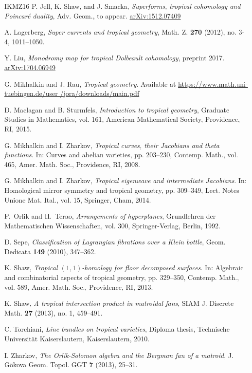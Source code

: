 \documentclass[11pt]{article}
\numberwithin{equation}{numsection}
\begin{document}
\begin{thebibliography}{IKMZ16}
P. Jell, K. Shaw, and J. Smacka,
\emph{Superforms, tropical cohomology and {P}oincar\'e duality},
Adv. Geom., to appear.
  \href{https://arxiv.org/abs/1512.07409}{arXiv:1512.07409}

A. Lagerberg,
\emph{Super currents and tropical geometry},
Math. Z. {\bf 270} (2012), no. 3-4, 1011--1050.

Y. Liu,
\emph{Monodromy map for tropical Dolbeault cohomology}, preprint 2017.
  \href{https://arxiv.org/abs/1704.06949}{arXiv:1704.06949}

G. Mikhalkin and J. Rau,
\emph{Tropical geometry}.
Available at
  \href{https://www.math.uni-tuebingen.de/user/jora/downloads/main.pdf}{https://www.math.uni-tuebingen.de/user /jora/downloads/main.pdf}

D. Maclagan and B. Sturmfels,
\emph{Introduction to tropical geometry}, 
Graduate Studies in Mathematics, vol. 161,
American Mathematical Society, Providence, RI, 2015.

G. Mikhalkin and I. Zharkov,
\emph{Tropical curves, their {J}acobians and theta functions}.
In: Curves and abelian varieties, 
pp. 203--230, Contemp. Math., vol. 465, Amer. Math. Soc., Providence, RI, 2008.

G. Mikhalkin and I. Zharkov,
\emph{Tropical eigenwave and intermediate {J}acobians}.
In: Homological mirror symmetry and tropical geometry, 
pp. 309--349, Lect. Notes Unione Mat. Ital., vol. 15, Springer, Cham, 2014.

P.~Orlik and H.~Terao,
\emph{Arrangements of hyperplanes},
Grundlehren der Mathematischen Wissenschaften, vol. 300,
Springer-Verlag, Berlin, 1992.

D. Sepe,
\emph{Classification of {L}agrangian fibrations over a {K}lein bottle},
Geom. Dedicata {\bf 149} (2010), 347--362.

K. Shaw,
\emph{Tropical $(1, 1)$-homology for floor decomposed surfaces}.
In: Algebraic and combinatorial aspects of tropical geometry, pp. 329--350, Contemp. Math., vol. 589, Amer. Math. Soc., Providence, RI, 2013.

K. Shaw,
\emph{A tropical intersection product in matroidal fans},
SIAM J. Discrete Math. {\bf 27} (2013), no. 1, 459--491.

C. Torchiani,
\emph{Line bundles on tropical varieties}, Diploma thesis, Technische Universit\"at Kaiserslautern, Kaiserslautern, 2010.

I. Zharkov,
\emph{The {O}rlik-{S}olomon algebra and the {B}ergman fan of a matroid},
J. G\"okova Geom. Topol. GGT {\bf 7} (2013), 25--31.
\end{thebibliography}
\end{document}
